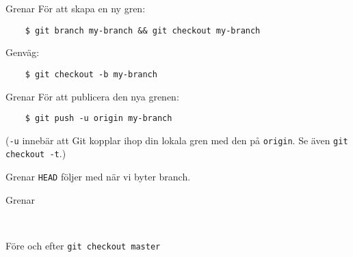 \documentclass[11pt,xetex]{beamer}
\begin{document}
\begin{frame}[fragile]{Grenar}
  \Large
  För att skapa en ny gren:

  \begin{verbatim}
    $ git branch my-branch && git checkout my-branch
  \end{verbatim}

  Genväg:

  \begin{verbatim}
    $ git checkout -b my-branch
  \end{verbatim}
\end{frame}

\begin{frame}[fragile]{Grenar}
  \Large
  För att publicera den nya grenen:

  \begin{verbatim}
    $ git push -u origin my-branch
  \end{verbatim}

  \scriptsize
  (\texttt{-u} innebär att Git kopplar ihop din lokala gren med den
  på \texttt{origin}. Se även \texttt{git checkout -t}.)
\end{frame}

\begin{frame}{Grenar}
  \Large
  \texttt{HEAD} följer med när vi byter branch.
\end{frame}

\begin{frame}{Grenar}
  \captionsetup{type=table}
  \begin{subfigure}[t]{0.5\textwidth}
    \centering
  \end{subfigure}%
  ~
  \begin{subfigure}[t]{0.5\textwidth}
    \centering
  \end{subfigure}

  \center
  Före och efter \texttt{git checkout master}
\end{frame}
\end{document}
